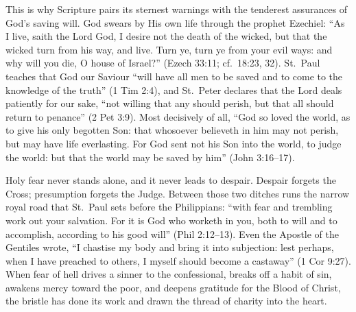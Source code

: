 This is why Scripture pairs its sternest warnings with the tenderest assurances of God's saving will. God swears by His own life through the prophet Ezechiel: ``As I live, saith the Lord God, I desire not the death of the wicked, but that the wicked turn from his way, and live. Turn ye, turn ye from your evil ways: and why will you die, O house of Israel?'' (Ezech 33:11; cf.\ 18:23, 32). St.\ Paul teaches that God our Saviour ``will have all men to be saved and to come to the knowledge of the truth'' (1 Tim 2:4), and St.\ Peter declares that the Lord deals patiently for our sake, ``not willing that any should perish, but that all should return to penance'' (2 Pet 3:9). Most decisively of all, ``God so loved the world, as to give his only begotten Son: that whosoever believeth in him may not perish, but may have life everlasting. For God sent not his Son into the world, to judge the world: but that the world may be saved by him'' (John 3:16--17).

Holy fear never stands alone, and it never leads to despair. Despair forgets the Cross; presumption forgets the Judge. Between those two ditches runs the narrow royal road that St.\ Paul sets before the Philippians: ``with fear and trembling work out your salvation. For it is God who worketh in you, both to will and to accomplish, according to his good will'' (Phil 2:12--13). Even the Apostle of the Gentiles wrote, ``I chastise my body and bring it into subjection: lest perhaps, when I have preached to others, I myself should become a castaway'' (1 Cor 9:27). When fear of hell drives a sinner to the confessional, breaks off a habit of sin, awakens mercy toward the poor, and deepens gratitude for the Blood of Christ, the bristle has done its work and drawn the thread of charity into the heart.
